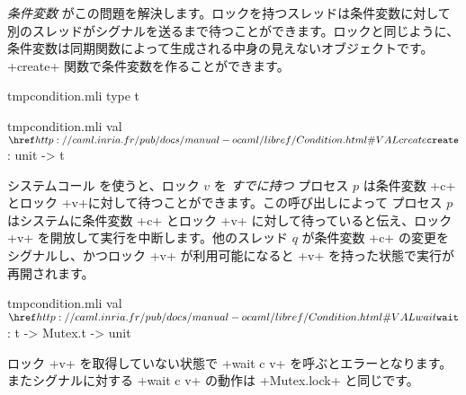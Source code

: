 \emph{条件変数} がこの問題を解決します。ロックを持つスレッドは条件変数に対して別のスレッドがシグナルを送るまで待つことができます。ロックと同じように、条件変数は同期関数によって生成される中身の見えないオブジェクトです。\ml+create+ 関数で条件変数を作ることができます。
%
\begin{codefile}{tmpcondition.mli}
type t
\end{codefile}
%
\begin{listingcodefile}{tmpcondition.mli}
val $\libvalue{Condition}{create}$ : unit -> t
\end{listingcodefile}
%
システムコール  を使うと、ロック $v$ を \emph{すでに持つ} プロセス $p$ は条件変数 \ml+c+ とロック \ml+v+に対して待つことができます。この呼び出しによって プロセス $p$ はシステムに条件変数 \ml+c+ とロック \ml+v+ に対して待っていると伝え、ロック \ml+v+ を開放して実行を中断します。他のスレッド $q$ が条件変数 \ml+c+ の変更をシグナルし、かつロック \ml+v+ が利用可能になると \ml+v+ を持った状態で実行が再開されます。
%
\begin{listingcodefile}{tmpcondition.mli}
val $\libvalue{Condition}{wait}$ : t -> Mutex.t -> unit
\end{listingcodefile}
%
ロック \ml+v+ を取得していない状態で \ml+wait c v+ を呼ぶとエラーとなります。またシグナルに対する \ml+wait c v+ の動作は \ml+Mutex.lock+ と同じです。

